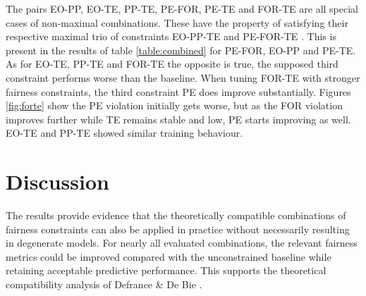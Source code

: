 The pairs EO-PP, EO-TE, PP-TE, PE-FOR, PE-TE and FOR-TE are all special cases of non-maximal combinations. These have the property of satisfying their respective maximal trio of constraints EO-PP-TE and PE-FOR-TE \cite{max_combinations}.
This is present in the results of table \ref{table:combined} for PE-FOR, EO-PP and PE-TE. As for EO-TE, PP-TE and FOR-TE the opposite is true, the supposed third constraint performs worse than the baseline. When tuning FOR-TE with stronger fairness constraints, the third constraint PE does improve substantially. Figures \ref{fig:forte} show the PE violation initially gets worse, but as the FOR violation improves further while TE remains stable and low, PE starts improving as well. EO-TE and PP-TE showed similar training behaviour.






\section{Discussion}

The results provide evidence that the theoretically compatible combinations of fairness constraints can also be applied in practice without necessarily resulting in degenerate models. For nearly all evaluated combinations, the relevant fairness metrics could be improved compared with the unconstrained baseline while retaining acceptable predictive performance. This supports the theoretical compatibility analysis of Defrance \& De Bie \cite{max_combinations}.
